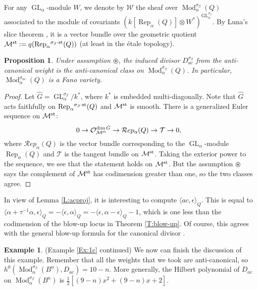 \documentclass{amsart}
\newtheorem{proposition}[theorem]{Proposition}
\theoremstyle{definition}
\newtheorem{example}[theorem]{Example}
\theoremstyle{remark}
\numberwithin{equation}{section}
\begin{document}
For any ${\operatorname{GL}}_\alpha$-module $W$, we denote by ${\mathcal{{W}}}$ the sheaf over ${\operatorname{Mod}}_\alpha^{\sigma_\beta}(Q)$ associated to the module of covariants $(k[{\operatorname{Rep}}_\alpha(Q)]\otimes W^*)^{{\operatorname{GL}}_\alpha^{\sigma_\beta}}$. By Luna's slice theorem \cite{Lu}, it is a vector bundle over the geometric quotient ${\mathcal{{M}}}^{\rm st}:=q({\operatorname{Rep}}_\alpha{^{\sigma_{{\beta}}\cdot{\rm {st}}}}(Q))$ (at least in the \'{e}tale topology).

\begin{proposition} Under assumption $\circledast$, the induced divisor $D_{ac}^{\sigma_\beta}$ from the anti-canonical weight is the anti-canonical class on ${\operatorname{Mod}}_\alpha^{\sigma_\beta}(Q)$. In particular, ${\operatorname{Mod}}_\alpha^{\sigma_{ac}}(Q)$ is a Fano variety.
\end{proposition}

\begin{proof} Let $\hat{G}={\operatorname{GL}}_\alpha^{\sigma_\beta}/k^*$, where $k^*$ is embedded multi-diagonally. Note that $\hat{G}$ acts faithfully on ${\operatorname{Rep}}_\alpha{^{\sigma_{{\beta}}\cdot{\rm {st}}}}(Q)$ and ${\mathcal{{M}}}^{\rm st}$ is smooth. There is a generalized Euler sequence on ${\mathcal{{M}}}^{\rm st}$:
$$0\to{\mathcal{{O}}}_{{\mathcal{{M}}}^{\rm st}}^{\dim\hat{G}}\to{\mathcal{{R}}}ep_\alpha(Q)\to {\mathcal{{T}}}\to 0,$$
where ${\mathcal{{R}}}ep_\alpha(Q)$ is the vector bundle corresponding to the ${\operatorname{GL}}_\alpha$-module ${\operatorname{Rep}}_\alpha(Q)$ and ${\mathcal{{T}}}$ is the tangent bundle on ${\mathcal{{M}}}^{\rm st}$. Taking the exterior power to the sequence, we see that the statement holds on ${\mathcal{{M}}}^{\rm st}$. But the assumption $\circledast$ says the complement of ${\mathcal{{M}}}^{\rm st}$ has codimension greater than one, so the two classes agree.
\end{proof}

In view of Lemma \ref{L:acproj}, it is interesting to compute ${\langle{ac,\epsilon}\rangle}_Q$. This is equal to ${\langle{\alpha+\tau^{-1}\alpha,\epsilon}\rangle}_Q=-{\langle{\epsilon,\alpha}\rangle}_Q=-{\langle{\epsilon,\alpha-\epsilon}\rangle}_Q-1$, which is one less than the codimension of the blow-up locus in Theorem \ref{T:blow-up}. Of course, this agrees with the general blow-up formula for the canonical divisor \cite[Exercise II.8.5]{Ha}.

\begin{example} (Example \ref{Ex:1c} continued) We now can finish the discussion of this example. Remember that all the weights that we took are anti-canonical, so $h^0({\operatorname{Mod}}_\alpha^{\sigma_\beta}(B^n),D_{ac})=10-n$. More generally, the Hilbert polynomial of $D_{ac}$ on ${\operatorname{Mod}}_\alpha^{\sigma_\beta}(B^n)$ is $\frac{1}{2}[(9-n)x^2+(9-n)x+2]$.
\end{example}
\end{document}
